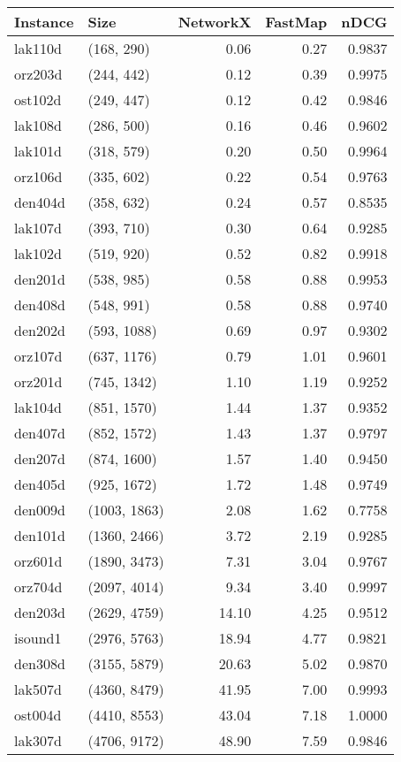 \begin{tabular}{llrrr}
\toprule
Instance &         Size &  NetworkX &  FastMap &   nDCG \\
\midrule
 lak110d &   (168, 290) &      0.06 &     0.27 & 0.9837 \\
 orz203d &   (244, 442) &      0.12 &     0.39 & 0.9975 \\
 ost102d &   (249, 447) &      0.12 &     0.42 & 0.9846 \\
 lak108d &   (286, 500) &      0.16 &     0.46 & 0.9602 \\
 lak101d &   (318, 579) &      0.20 &     0.50 & 0.9964 \\
 orz106d &   (335, 602) &      0.22 &     0.54 & 0.9763 \\
 den404d &   (358, 632) &      0.24 &     0.57 & 0.8535 \\
 lak107d &   (393, 710) &      0.30 &     0.64 & 0.9285 \\
 lak102d &   (519, 920) &      0.52 &     0.82 & 0.9918 \\
 den201d &   (538, 985) &      0.58 &     0.88 & 0.9953 \\
 den408d &   (548, 991) &      0.58 &     0.88 & 0.9740 \\
 den202d &  (593, 1088) &      0.69 &     0.97 & 0.9302 \\
 orz107d &  (637, 1176) &      0.79 &     1.01 & 0.9601 \\
 orz201d &  (745, 1342) &      1.10 &     1.19 & 0.9252 \\
 lak104d &  (851, 1570) &      1.44 &     1.37 & 0.9352 \\
 den407d &  (852, 1572) &      1.43 &     1.37 & 0.9797 \\
 den207d &  (874, 1600) &      1.57 &     1.40 & 0.9450 \\
 den405d &  (925, 1672) &      1.72 &     1.48 & 0.9749 \\
 den009d & (1003, 1863) &      2.08 &     1.62 & 0.7758 \\
 den101d & (1360, 2466) &      3.72 &     2.19 & 0.9285 \\
 orz601d & (1890, 3473) &      7.31 &     3.04 & 0.9767 \\
 orz704d & (2097, 4014) &      9.34 &     3.40 & 0.9997 \\
 den203d & (2629, 4759) &     14.10 &     4.25 & 0.9512 \\
 isound1 & (2976, 5763) &     18.94 &     4.77 & 0.9821 \\
 den308d & (3155, 5879) &     20.63 &     5.02 & 0.9870 \\
 lak507d & (4360, 8479) &     41.95 &     7.00 & 0.9993 \\
 ost004d & (4410, 8553) &     43.04 &     7.18 & 1.0000 \\
 lak307d & (4706, 9172) &     48.90 &     7.59 & 0.9846 \\
\bottomrule
\end{tabular}
